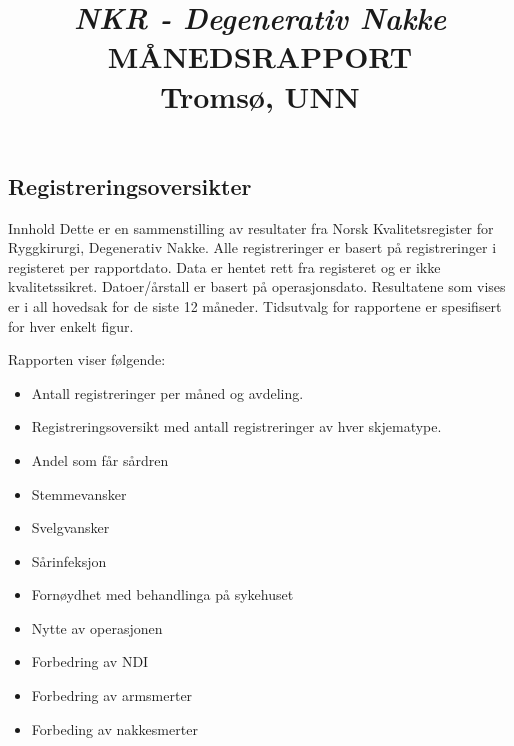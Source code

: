\documentclass[presentation,xcolor=pdftex,dvipsnames,table]{beamer}\usepackage[]{graphicx}\usepackage[]{color}
\title[Degenerativ Nakke \\Tromsø, UNN]{\textit{NKR - Degenerativ Nakke} \\
MÅNEDSRAPPORT \\
Tromsø, UNN}
\date{}
\begin{document}
\begin{tiny}

\maketitle

\section{Registreringsoversikter}

\begin{frame}[fragile] {Innhold}
Dette er en sammenstilling av resultater  fra Norsk Kvalitetsregister for Ryggkirurgi, Degenerativ Nakke.
Alle registreringer er basert på registreringer i registeret per rapportdato. Data er hentet rett fra registeret og er ikke kvalitetssikret.
Datoer/årstall er basert på operasjonsdato. Resultatene som vises er i all hovedsak for de siste 12 måneder.
Tidsutvalg for rapportene er spesifisert for hver enkelt figur.

Rapporten viser følgende:
\begin{itemize}
\item Antall registreringer per måned og avdeling.
\item	Registreringsoversikt med antall registreringer av hver skjematype.
\item Andel som får sårdren
\item	Stemmevansker
\item	Svelgvansker
\item	Sårinfeksjon
\item	Fornøydhet med behandlinga på sykehuset
\item	Nytte av operasjonen
\item Forbedring av NDI
\item Forbedring av armsmerter
\item Forbeding av nakkesmerter
\end{itemize}

\end{frame}


\begin{frame}[fragile]


\end{frame}
\end{tiny}
\end{document}

